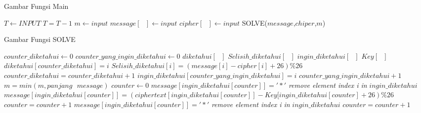 \documentclass[11pt]{article}
\begin{document}
\begin{algorithm}[H]
    \caption{Gambar Fungsi Main}
    \begin{algorithmic}[1]
			\State $T \leftarrow INPUT$
				\State $T=T-1$
				\State $m \gets input$      
				\State $message [\textrm{ }] \gets input$    
				\State $cipher [\textrm{ }] \gets input$     
				\State SOLVE($message$,$chiper$,$m$)
            \EndWhile
        \EndFunction
    \end{algorithmic}
\end{algorithm}

\begin{algorithm}[H]
	\centering
    \caption{Gambar Fungsi SOLVE}
    \begin{algorithmic}[1]
			\State $counter\_diketahui \gets 0 $            
            \State $counter\_yang\_ingin\_diketahui \gets 0$
            \State $diketahui [\textrm{ }]$
            \State $Selisih\_diketahui [\textrm{ }]$
            \State $ingin\_diketahui [\textrm{ }]$
            \State $Key [\textrm{ }]$
                    \State $diketahui[counter\_diketahui]=i$
                    \State $Selisih\_diketahui[i]=(message[i]-cipher[i]+26)\%26$
                    \State $counter\_diketahui = counter\_diketahui+1$
                	\State $ingin\_diketahui[counter\_yang\_ingin\_diketahui]=i$
                	\State $counter\_yang\_ingin\_diketahui + 1 $
                \EndIf
            \EndFor
            \State $m=min(m,panjang \textrm{ } message)$
					\State $counter \gets 0$
							\State $message[ingin\_diketahui[counter]] ='*'$
							\State \textit{remove element index i in }$ingin\_diketahui$
							\State $message[ingin\_diketahui[counter]]=(ciphertext[ingin\_diketahui[counter]]-Key[ingin\_diketahui[counter] + 26) \% 26$
							\State $counter=counter+1$
						\ElsIf{$message[ingin\_diketahui[counter]] \neq \textrm{ } (ciphertext[ingin\_diketahui[counter]]\textrm{ } -Key[ingin\_diketahui[counter] + 26)\textrm{ } \% 26$)}
							\State $message[ingin\_diketahui[counter]] ='*'$
							\State \textit{remove element index i in }$ingin\_diketahui$
						\Else
							\State $counter=counter+1$
						\EndIf
					\EndWhile
            	\EndIf
            \EndFor
        \EndFunction
    \end{algorithmic}
\end{algorithm}
\end{document}
